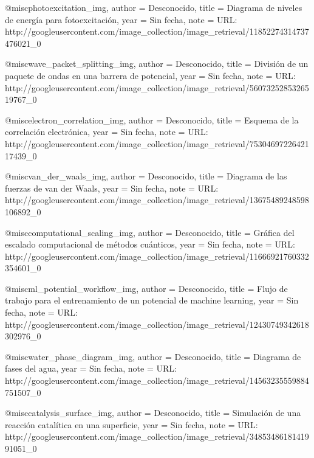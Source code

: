 @misc{photoexcitation_img,
  author = {{Desconocido}},
  title  = {Diagrama de niveles de energ\'{i}a para fotoexcitaci\'{o}n},
  year   = {{Sin fecha}},
  note   = {URL: http://googleusercontent.com/image_collection/image_retrieval/11852274314737476021_0}
}

@misc{wave_packet_splitting_img,
  author = {{Desconocido}},
  title  = {Divisi\'{o}n de un paquete de ondas en una barrera de potencial},
  year   = {{Sin fecha}},
  note   = {URL: http://googleusercontent.com/image_collection/image_retrieval/5607325285326519767_0}
}

@misc{electron_correlation_img,
  author = {{Desconocido}},
  title  = {Esquema de la correlaci\'{o}n electr\'{o}nica},
  year   = {{Sin fecha}},
  note   = {URL: http://googleusercontent.com/image_collection/image_retrieval/7530469722642117439_0}
}

@misc{van_der_waals_img,
  author = {{Desconocido}},
  title  = {Diagrama de las fuerzas de van der Waals},
  year   = {{Sin fecha}},
  note   = {URL: http://googleusercontent.com/image_collection/image_retrieval/13675489248598106892_0}
}

@misc{computational_scaling_img,
  author = {{Desconocido}},
  title  = {Gr\'{a}fica del escalado computacional de m\'{e}todos cu\'{a}nticos},
  year   = {{Sin fecha}},
  note   = {URL: http://googleusercontent.com/image_collection/image_retrieval/11666921760332354601_0}
}

@misc{ml_potential_workflow_img,
  author = {{Desconocido}},
  title  = {Flujo de trabajo para el entrenamiento de un potencial de machine learning},
  year   = {{Sin fecha}},
  note   = {URL: http://googleusercontent.com/image_collection/image_retrieval/12430749342618302976_0}
}

@misc{water_phase_diagram_img,
  author = {{Desconocido}},
  title  = {Diagrama de fases del agua},
  year   = {{Sin fecha}},
  note   = {URL: http://googleusercontent.com/image_collection/image_retrieval/14563235559884751507_0}
}

@misc{catalysis_surface_img,
  author = {{Desconocido}},
  title  = {Simulaci\'{o}n de una reacci\'{o}n catal\'{i}tica en una superficie},
  year   = {{Sin fecha}},
  note   = {URL: http://googleusercontent.com/image_collection/image_retrieval/3485348618141991051_0}
}
